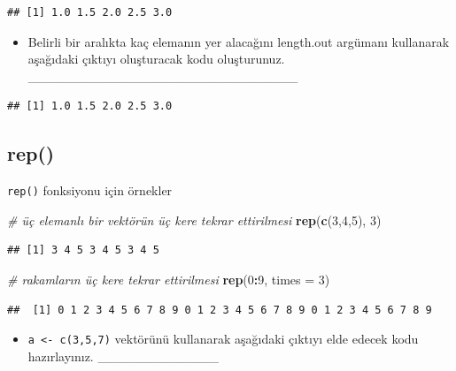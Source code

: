 \documentclass[
  oneside]{book}
\newenvironment{Shaded}{\begin{snugshade}}{\end{snugshade}}
\newcommand{\AttributeTok}[1]{\textcolor[rgb]{0.13,0.29,0.53}{#1}}
\newcommand{\CommentTok}[1]{\textcolor[rgb]{0.56,0.35,0.01}{\textit{#1}}}
\newcommand{\DecValTok}[1]{\textcolor[rgb]{0.00,0.00,0.81}{#1}}
\newcommand{\FunctionTok}[1]{\textcolor[rgb]{0.13,0.29,0.53}{\textbf{#1}}}
\newcommand{\NormalTok}[1]{#1}
\newcommand{\SpecialCharTok}[1]{\textcolor[rgb]{0.81,0.36,0.00}{\textbf{#1}}}
\providecommand{\tightlist}{%
  \setlength{\itemsep}{0pt}\setlength{\parskip}{0pt}}
\begin{document}
\begin{verbatim}
## [1] 1.0 1.5 2.0 2.5 3.0
\end{verbatim}

\begin{itemize}
\tightlist
\item
  Belirli bir aralıkta kaç elemanın yer alacağını length.out argümanı kullanarak aşağıdaki çıktıyı oluşturacak kodu oluşturunuz. \_\_\_\_\_\_\_\_\_\_\_\_\_\_\_\_\_\_\_\_\_\_\_\_\_\_\_\_\_
\end{itemize}

\begin{verbatim}
## [1] 1.0 1.5 2.0 2.5 3.0
\end{verbatim}

\hypertarget{rep}{%
\subsection{rep()}\label{rep}}

\texttt{rep()} fonksiyonu için örnekler

\begin{Shaded}
\begin{Highlighting}[]
\CommentTok{\# üç elemanlı bir vektörün üç kere tekrar ettirilmesi}
\FunctionTok{rep}\NormalTok{(}\FunctionTok{c}\NormalTok{(}\DecValTok{3}\NormalTok{,}\DecValTok{4}\NormalTok{,}\DecValTok{5}\NormalTok{), }\DecValTok{3}\NormalTok{)}
\end{Highlighting}
\end{Shaded}

\begin{verbatim}
## [1] 3 4 5 3 4 5 3 4 5
\end{verbatim}

\begin{Shaded}
\begin{Highlighting}[]
\CommentTok{\# rakamların üç kere tekrar ettirilmesi}
\FunctionTok{rep}\NormalTok{(}\DecValTok{0}\SpecialCharTok{:}\DecValTok{9}\NormalTok{, }\AttributeTok{times =} \DecValTok{3}\NormalTok{) }
\end{Highlighting}
\end{Shaded}

\begin{verbatim}
##  [1] 0 1 2 3 4 5 6 7 8 9 0 1 2 3 4 5 6 7 8 9 0 1 2 3 4 5 6 7 8 9
\end{verbatim}

\begin{itemize}
\tightlist
\item
  \texttt{a\ \textless{}-\ c(3,5,7)} vektörünü kullanarak aşağıdaki çıktıyı elde edecek kodu hazırlayınız. \_\_\_\_\_\_\_\_\_\_\_\_\_
\end{itemize}
\end{document}
